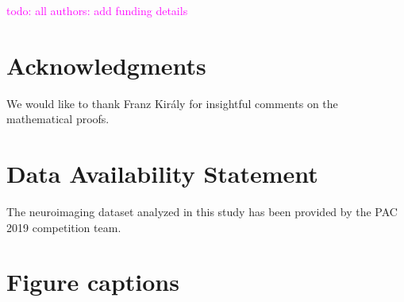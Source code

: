 \documentclass[utf8]{frontiersSCNS} %
\newcommand{\todo}[1]{\textcolor{Magenta}{todo: #1}}
\begin{document}
\todo{all authors: add funding details}

\section*{Acknowledgments}
We would like to thank Franz Kir\'aly for insightful comments on the mathematical proofs.

\section*{Data Availability Statement}
The neuroimaging dataset analyzed in this study has been provided by the PAC 2019 competition team.




\section*{Figure captions}

\end{document}
